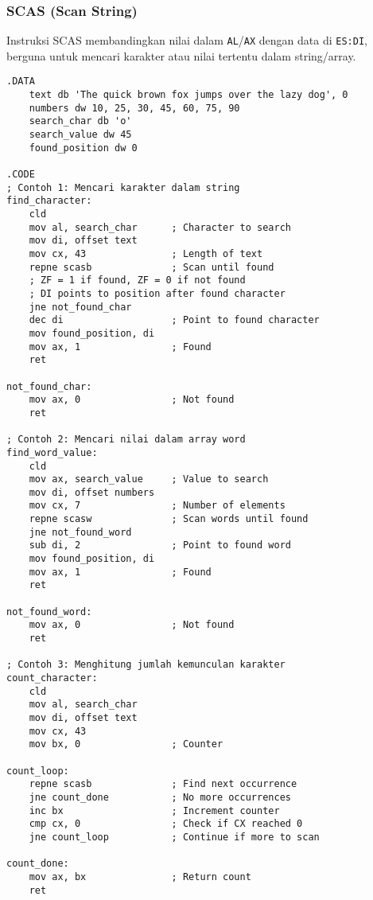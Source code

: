 \documentclass[../main.tex]{subfiles}
\begin{document}
            \subsubsection{SCAS (Scan String)}
                Instruksi SCAS membandingkan nilai dalam \texttt{AL}/\texttt{AX} dengan data di \texttt{ES:DI}, berguna untuk mencari karakter atau nilai tertentu dalam string/array.

                \begin{lstlisting}[language={[x86masm]Assembler}, caption=Contoh Instruksi SCAS, label={lst:scas-examples}]
.DATA
    text db 'The quick brown fox jumps over the lazy dog', 0
    numbers dw 10, 25, 30, 45, 60, 75, 90
    search_char db 'o'
    search_value dw 45
    found_position dw 0

.CODE
; Contoh 1: Mencari karakter dalam string
find_character:
    cld
    mov al, search_char      ; Character to search
    mov di, offset text
    mov cx, 43               ; Length of text
    repne scasb              ; Scan until found
    ; ZF = 1 if found, ZF = 0 if not found
    ; DI points to position after found character
    jne not_found_char
    dec di                   ; Point to found character
    mov found_position, di
    mov ax, 1                ; Found
    ret
    
not_found_char:
    mov ax, 0                ; Not found
    ret

; Contoh 2: Mencari nilai dalam array word
find_word_value:
    cld
    mov ax, search_value     ; Value to search
    mov di, offset numbers
    mov cx, 7                ; Number of elements
    repne scasw              ; Scan words until found
    jne not_found_word
    sub di, 2                ; Point to found word
    mov found_position, di
    mov ax, 1                ; Found
    ret
    
not_found_word:
    mov ax, 0                ; Not found
    ret

; Contoh 3: Menghitung jumlah kemunculan karakter
count_character:
    cld
    mov al, search_char
    mov di, offset text
    mov cx, 43
    mov bx, 0                ; Counter
    
count_loop:
    repne scasb              ; Find next occurrence
    jne count_done           ; No more occurrences
    inc bx                   ; Increment counter
    cmp cx, 0                ; Check if CX reached 0
    jne count_loop           ; Continue if more to scan
    
count_done:
    mov ax, bx               ; Return count
    ret


\end{lstlisting}
\end{document}
